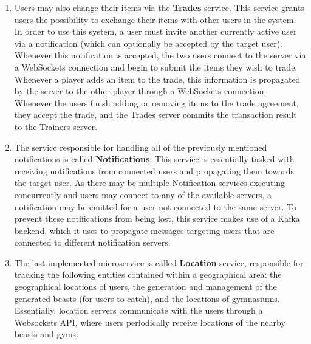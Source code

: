 \begin{enumerate}
    \item Users may also change their items via the \textbf{Trades} service. This service grants users the possibility to exchange their items with other users in the system. In order to use this system, a user must invite another currently active user via a notification (which can optionally be accepted by the target user). Whenever this notification is accepted, the two users connect to the server via a WebSockets connection and begin to submit the items they wish to trade. Whenever a player adds an item to the trade, this information is propagated by the server to the other player through a WebSockets connection. Whenever the users finish adding or removing items to the trade agreement, they accept the trade, and the Trades server commits the transaction result to the Trainers server.

    \item The service responsible for handling all of the previously mentioned notifications is called \textbf{Notifications}. This service is essentially tasked with receiving notifications from connected users and propagating them towards the target user. As there may be multiple Notification services executing concurrently and users may connect to any of the available servers, a notification may be emitted for a user not connected to the same server. To prevent these notifications from being lost, this service makes use of a Kafka  backend, which it uses to propagate messages targeting users that are connected to different notification servers.

    \item The last implemented microservice is called \textbf{Location} service, responsible for tracking the following entities contained within a geographical area: the geographical locations of users, the generation and management of the generated beasts (for users to catch), and the locations of gymnasiums. Essentially, location servers communicate with the users through a Websockets API, where users periodically receive locations of the nearby beasts and gyms. 
\end{enumerate}


